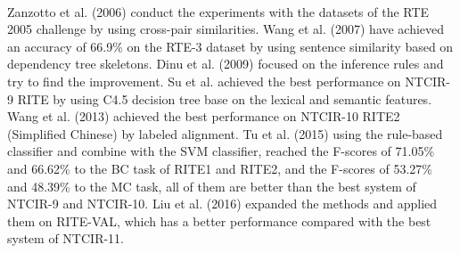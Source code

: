\documentclass{article}
\begin{document}
\begin{CJK*}{UTF8}{bkai}
\paragraph{}
Zanzotto et al. (2006)\cite{zanzotto_moschitti_2006} conduct the experiments with the datasets of the RTE 2005 challenge by using cross-pair similarities. Wang et al. (2007) have achieved an accuracy of 66.9\% on the RTE-3 dataset by using sentence similarity based on dependency tree skeletons. Dinu et al. (2009)\cite{dinu_wang_2009} focused on the inference rules and try to find the improvement. Su et al.\cite{su_zheng_2011} achieved the best performance on NTCIR-9 RITE by using C4.5 decision tree base on the lexical and semantic features. Wang et al. (2013)\cite{wang-etal-2013-labeled} achieved the best performance on NTCIR-10 RITE2 (Simplified Chinese) by labeled alignment. Tu et al. (2015)\cite{tu_2015} using the rule-based classifier and combine with the SVM classifier, reached the F-scores of 71.05\% and 66.62\% to the BC task of RITE1 and RITE2, and the F-scores of 53.27\% and 48.39\% to the MC task, all of them are better than the best system of NTCIR-9 and NTCIR-10. Liu et al. (2016)\cite{liu_2016} expanded the methods and applied them on RITE-VAL, which has a better performance compared with the best system of NTCIR-11.


\end{CJK*}
\end{document}

